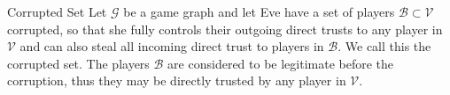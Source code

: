 {}
\begin{definitiongr}{Corrupted Set}
  Let $\mathcal{G}$ be a game graph and let Eve have a set of players $\mathcal{B} \subset \mathcal{V}$ corrupted, so
  that she fully controls their outgoing direct trusts to any player in $\mathcal{V}$ and can also steal all incoming
  direct trust to players in $\mathcal{B}$. We call this the corrupted set. The players $\mathcal{B}$ are considered to
  be legitimate before the corruption, thus they may be directly trusted by any player in $\mathcal{V}$.
\end{definitiongr}
